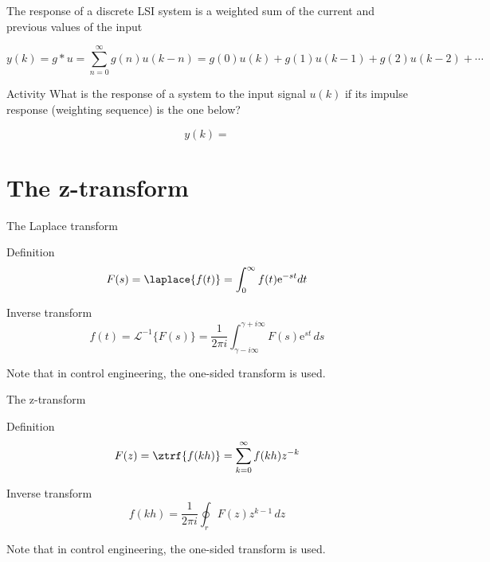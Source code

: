 \documentclass[presentation,aspectratio=169]{beamer}
\begin{document}
\begin{frame}[label={sec:org577acfc}]{The response of a discrete LSI system is a weighted sum of the current and previous values of the input}
\small 

\[ y(k) = g \ast u = \sum_{n=0}^\infty g(n) u(k-n) = g(0)u(k) + g(1)u(k-1) + g(2)u(k-2) + \cdots \]


\alert{Activity} What is the response of a system to the input signal \(u(k)\) if its impulse response (weighting sequence) is the one below?

\begin{center}
\end{center}

\[y(k) = \]
\end{frame}


\section{The z-transform}
\label{sec:org2fdb3a4}
\begin{frame}[label={sec:org4e5859c}]{The Laplace transform}
\begin{block}{Definition}
\[ F(s) = \laplace{f(t)} = \int_0^\infty f(t) \mathrm{e}^{-st} dt\]
\end{block}
\begin{block}{Inverse transform}
\[ f(t) = \mathcal{L}^{-1}\{F(s)\} = \frac{1}{2\pi i} \int_{\gamma - i\infty}^{\gamma + i\infty} F(s)\mathrm{e}^{st} \, ds \]

Note that in control engineering, the one-sided transform is used.
\end{block}
\end{frame}

\begin{frame}[label={sec:org465eb16}]{The z-transform}
\begin{block}{Definition}
\[ F(z) = \ztrf{f(kh)} = \sum_{k=0}^{\infty} f(kh)z^{-k} \]
\end{block}

\begin{block}{Inverse transform}
\[ f(kh) = \frac{1}{2\pi i} \oint_r F(z) z^{k-1} \, dz \]

Note that in control engineering, the one-sided transform is used.
\end{block}
\end{frame}
\end{document}
